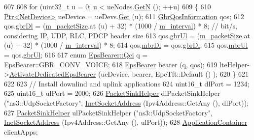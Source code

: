 \begin{DoxyCode}
607 
608   \textcolor{keywordflow}{for} (uint32\_t u = 0; u < ueNodes.\hyperlink{classns3_1_1NodeContainer_aed647ac56d0407a7706aba02eb44b951}{GetN} (); ++u)
609     \{
610       \hyperlink{classns3_1_1Ptr}{Ptr<NetDevice>} ueDevice = ueDevs.\hyperlink{classns3_1_1NetDeviceContainer_a677d62594b5c9d2dea155cc5045f4d0b}{Get} (u);
611       \hyperlink{structns3_1_1GbrQosInformation}{GbrQosInformation} qos;
612       qos.\hyperlink{structns3_1_1GbrQosInformation_a70b6106f5918d464d296bc23415ec801}{gbrDl} = (\hyperlink{classLenaPssFfMacSchedulerTestCase2_a91fce939c11d7abd86121e57485d8027}{m\_packetSize}.at (u) + 32) * (1000 / 
      \hyperlink{classLenaPssFfMacSchedulerTestCase2_a80853226f76f2201046d2e6c799680ac}{m\_interval}) * 8;  \textcolor{comment}{// bit/s, considering IP, UDP, RLC, PDCP header size}
613       qos.\hyperlink{structns3_1_1GbrQosInformation_a8027f26c8fd5fd643d5af7a6a879860f}{gbrUl} = (\hyperlink{classLenaPssFfMacSchedulerTestCase2_a91fce939c11d7abd86121e57485d8027}{m\_packetSize}.at (u) + 32) * (1000 / 
      \hyperlink{classLenaPssFfMacSchedulerTestCase2_a80853226f76f2201046d2e6c799680ac}{m\_interval}) * 8;
614       qos.\hyperlink{structns3_1_1GbrQosInformation_ac059dd3ad95475e8df63e52d9c2235e7}{mbrDl} = qos.\hyperlink{structns3_1_1GbrQosInformation_a70b6106f5918d464d296bc23415ec801}{gbrDl};
615       qos.\hyperlink{structns3_1_1GbrQosInformation_afce406e4f92771305075ace6cfe83e36}{mbrUl} = qos.\hyperlink{structns3_1_1GbrQosInformation_a8027f26c8fd5fd643d5af7a6a879860f}{gbrUl};
616   
617       \textcolor{keyword}{enum} \hyperlink{structns3_1_1EpsBearer_aecf0c67109c5eb4ec0b07226fff5885e}{EpsBearer::Qci} q = EpsBearer::GBR\_CONV\_VOICE;
618       \hyperlink{structns3_1_1EpsBearer}{EpsBearer} bearer (q, qos);
619       lteHelper->\hyperlink{classns3_1_1LteHelper_af28041edd4c96bde1a2e07c90e363dcc}{ActivateDedicatedEpsBearer} (ueDevice, bearer, EpcTft::Default ()
      );  
620     \}
621 
622 
623   \textcolor{comment}{// Install downlind and uplink applications}
624   uint16\_t dlPort = 1234;
625   uint16\_t ulPort = 2000;
626   \hyperlink{classns3_1_1PacketSinkHelper}{PacketSinkHelper} dlPacketSinkHelper (\textcolor{stringliteral}{"ns3::UdpSocketFactory"}, 
      \hyperlink{classns3_1_1InetSocketAddress}{InetSocketAddress} (Ipv4Address::GetAny (), dlPort));
627   \hyperlink{classns3_1_1PacketSinkHelper}{PacketSinkHelper} ulPacketSinkHelper (\textcolor{stringliteral}{"ns3::UdpSocketFactory"}, 
      \hyperlink{classns3_1_1InetSocketAddress}{InetSocketAddress} (Ipv4Address::GetAny (), ulPort));
628   \hyperlink{classns3_1_1ApplicationContainer}{ApplicationContainer} clientApps;

\end{DoxyCode}
